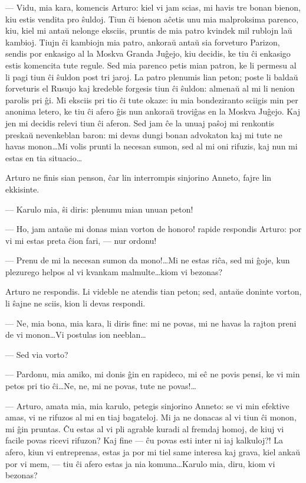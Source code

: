  --- Vidu, mia kara, komencis Arturo: kiel vi jam scias, mi havis tre
bonan bienon, kiu estis vendita pro \^suldoj. Tiun \^ci bienon
a\^cetis unu mia malproksima parenco, kiu, kiel mi anta\u u nelonge
eksciis, pruntis de mia patro kvindek mil rublojn la\u u kambioj.
Tiujn \^ci kambiojn mia patro, ankora\u u anta\u u sia forveturo
Parizon, sendis por enkasigo al la Moskva Granda Ju\^gejo, kiu
decidis, ke tiu \^ci enkasigo estis komencita tute regule. Sed mia
parenco petis mian patron, ke li permesu al li pagi tiun \^ci
\^suldon post tri jaroj. La patro plenumis lian peton; poste li
balda\u u forveturis el Rusujo kaj kredeble forgesis tiun \^ci
\^suldon: almena\u u al mi li nenion parolis pri \^gi. Mi eksciis
pri tio \^ci tute okaze: iu mia bondeziranto sciigis min per anonima
letero, ke tiu \^ci afero \^gis nun ankora\u u trovi\^gas en la
Moskva Ju\^gejo. Kaj jen mi decidis relevi tiun \^ci aferon. Sed jam
\^ce la unuaj pa\^soj mi renkontis preska\u u nevenkeblan baron: mi
devas dungi bonan advokaton kaj mi tute ne havas monon\dots Mi volis
prunti la necesan sumon, sed al mi oni rifuzis, kaj nun mi estas en
tia situacio\dots

   Arturo ne finis sian penson, \^car lin interrompis sinjorino Anneto,
fajre lin ekkisinte.

 --- Karulo mia, \^si diris: plenumu mian unuan peton!

 --- Ho, jam anta\u ue mi donas mian vorton de honoro! rapide respondis
Arturo: por vi mi estas preta \^cion fari, --- nur ordonu!

 --- Prenu de mi la necesan sumon da mono!\dots Mi ne estas ri\^ca,
sed mi \^goje, kun plezurego helpos al vi kvankam malmulte\dots kiom
vi bezonas?

   Arturo ne respondis. Li videble ne atendis tian peton; sed, anta\u ue
doninte vorton, li \^sajne ne sciis, kion li devas respondi.

 --- Ne, mia bona, mia kara, li diris fine: mi ne povas, mi ne havas
la rajton preni de vi monon\dots Vi postulas ion neeblan\dots

 --- Sed via vorto?

 --- Pardonu, mia amiko, mi donis \^gin en rapideco, mi e\^c ne povis
pensi, ke vi min petos pri tio \^ci\dots Ne, ne, mi ne povas, tute
ne povas!\dots

 --- Arturo, amata mia, mia karulo, petegis sinjorino Anneto: se vi
min efektive amas, vi ne rifuzos al mi en tiaj bagateloj. Mi ja ne
donacas al vi tiun \^ci monon, mi \^gin pruntas. \^Cu estas al vi
pli agrable kuradi al fremdaj homoj, de kiuj vi facile povas ricevi
rifuzon? Kaj fine --- \^cu povas esti inter ni iaj kalkuloj?! La
afero, kiun vi entreprenas, estas ja por mi tiel same interesa kaj
grava, kiel anka\u u por vi mem, --- tiu \^ci afero estas ja nia
komuna\dots Karulo mia, diru, kiom vi bezonas?

